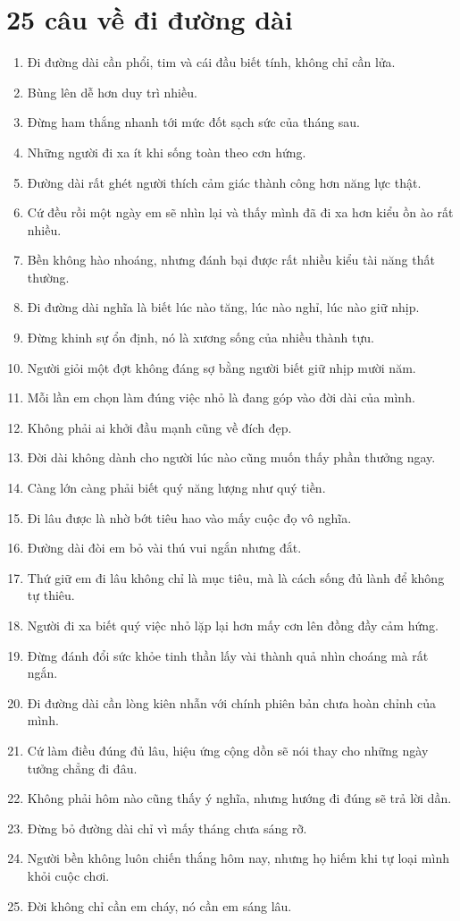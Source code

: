 \section{25 câu về đi đường dài}
\begin{enumerate}[leftmargin=*,resume]
\item Đi đường dài cần phổi, tim và cái đầu biết tính, không chỉ cần lửa.
\item Bùng lên dễ hơn duy trì nhiều.
\item Đừng ham thắng nhanh tới mức đốt sạch sức của tháng sau.
\item Những người đi xa ít khi sống toàn theo cơn hứng.
\item Đường dài rất ghét người thích cảm giác thành công hơn năng lực thật.
\item Cứ đều rồi một ngày em sẽ nhìn lại và thấy mình đã đi xa hơn kiểu ồn ào rất nhiều.
\item Bền không hào nhoáng, nhưng đánh bại được rất nhiều kiểu tài năng thất thường.
\item Đi đường dài nghĩa là biết lúc nào tăng, lúc nào nghỉ, lúc nào giữ nhịp.
\item Đừng khinh sự ổn định, nó là xương sống của nhiều thành tựu.
\item Người giỏi một đợt không đáng sợ bằng người biết giữ nhịp mười năm.
\item Mỗi lần em chọn làm đúng việc nhỏ là đang góp vào đời dài của mình.
\item Không phải ai khởi đầu mạnh cũng về đích đẹp.
\item Đời dài không dành cho người lúc nào cũng muốn thấy phần thưởng ngay.
\item Càng lớn càng phải biết quý năng lượng như quý tiền.
\item Đi lâu được là nhờ bớt tiêu hao vào mấy cuộc đọ vô nghĩa.
\item Đường dài đòi em bỏ vài thú vui ngắn nhưng đắt.
\item Thứ giữ em đi lâu không chỉ là mục tiêu, mà là cách sống đủ lành để không tự thiêu.
\item Người đi xa biết quý việc nhỏ lặp lại hơn mấy cơn lên đồng đầy cảm hứng.
\item Đừng đánh đổi sức khỏe tinh thần lấy vài thành quả nhìn choáng mà rất ngắn.
\item Đi đường dài cần lòng kiên nhẫn với chính phiên bản chưa hoàn chỉnh của mình.
\item Cứ làm điều đúng đủ lâu, hiệu ứng cộng dồn sẽ nói thay cho những ngày tưởng chẳng đi đâu.
\item Không phải hôm nào cũng thấy ý nghĩa, nhưng hướng đi đúng sẽ trả lời dần.
\item Đừng bỏ đường dài chỉ vì mấy tháng chưa sáng rỡ.
\item Người bền không luôn chiến thắng hôm nay, nhưng họ hiếm khi tự loại mình khỏi cuộc chơi.
\item Đời không chỉ cần em cháy, nó cần em sáng lâu.
\end{enumerate}

